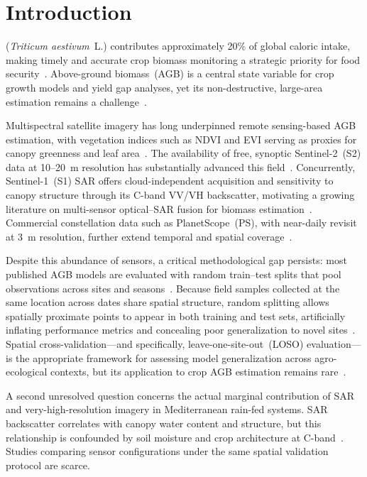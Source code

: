 \documentclass[lettersize,journal]{IEEEtran}
\begin{document}
\section{Introduction}
 (\textit{Triticum aestivum}~L.) contributes
approximately 20\% of global caloric intake, making timely and accurate crop
biomass monitoring a strategic priority for food security~\cite{ref1}.
Above-ground biomass~(AGB) is a central state variable for crop growth models
and yield gap analyses, yet its non-destructive, large-area estimation remains
a challenge~\cite{ref2}.

Multispectral satellite imagery has long underpinned remote sensing-based AGB
estimation, with vegetation indices such as NDVI and EVI serving as proxies
for canopy greenness and leaf area~\cite{ref3}. The availability of free,
synoptic Sentinel-2~(S2) data at 10--20~m resolution has substantially
advanced this field~\cite{ref4}. Concurrently, Sentinel-1~(S1) SAR offers
cloud-independent acquisition and sensitivity to canopy structure through its
C-band VV/VH backscatter, motivating a growing literature on multi-sensor
optical--SAR fusion for biomass estimation~\cite{ref5,ref6}. Commercial
constellation data such as PlanetScope~(PS), with near-daily revisit at 3~m
resolution, further extend temporal and spatial coverage~\cite{ref7}.

Despite this abundance of sensors, a critical methodological gap persists:
most published AGB models are evaluated with random train--test splits that
pool observations across sites and seasons~\cite{ref8}. Because field samples
collected at the same location across dates share spatial structure, random
splitting allows spatially proximate points to appear in both training and test
sets, artificially inflating performance metrics and concealing poor
generalization to novel sites~\cite{ref9}. Spatial cross-validation---and
specifically, leave-one-site-out~(LOSO) evaluation---is the appropriate
framework for assessing model generalization across agro-ecological contexts,
but its application to crop AGB estimation remains rare~\cite{ref10}.

A second unresolved question concerns the actual marginal contribution of SAR
and very-high-resolution imagery in Mediterranean rain-fed systems. SAR
backscatter correlates with canopy water content and structure, but this
relationship is confounded by soil moisture and crop architecture at
C-band~\cite{ref11,ref12}. Studies comparing sensor configurations under the
same spatial validation protocol are scarce.
\end{document}
